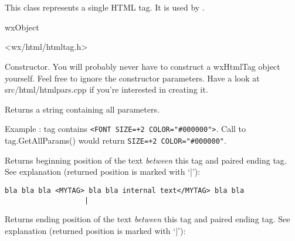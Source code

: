 %
%

\section{}\label{wxhtmltag}

This class represents a single HTML tag. 
It is used by .


wxObject


<wx/html/htmltag.h>


\label{wxhtmltagwxhtmltag}


Constructor. You will probably never have to construct a wxHtmlTag object
yourself. Feel free to ignore the constructor parameters.
Have a look at src/html/htmlpars.cpp if you're interested in creating it.

\label{wxhtmltaggetallparams}


Returns a string containing all parameters.

Example : tag contains {\tt <FONT SIZE=+2 COLOR="\#000000">}. Call to
tag.GetAllParams() would return {\tt SIZE=+2 COLOR="\#000000"}.


\label{wxhtmltaggetbeginpos}


Returns beginning position of the text {\it between} this tag and paired
ending tag. 
See explanation (returned position is marked with `|'):

\begin{verbatim}
bla bla bla <MYTAG> bla bla internal text</MYTAG> bla bla
                   |
\end{verbatim}


\label{wxhtmltaggetendpos1}


Returns ending position of the text {\it between} this tag and paired
ending tag.
See explanation (returned position is marked with `|'):

